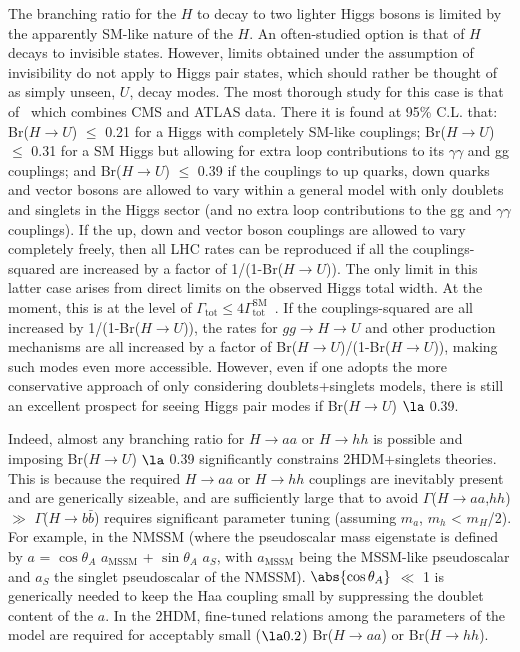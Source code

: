 The branching ratio for the $H$ to decay to two lighter Higgs bosons is limited by the apparently SM-like nature of the $H$. An often-studied option is that of $H$ decays to invisible states. However, limits obtained under the assumption of invisibility do not apply to Higgs pair states, which should rather be thought of as simply unseen, $U$, decay modes. The most thorough study for this case is that of~\cite{Belanger:2013xza} which combines CMS and ATLAS data. There it is found at 95\% C.L. that: Br($H$$\rightarrow$$U$) $\le$ 0.21 for a Higgs with completely SM-like couplings; Br($H$$\rightarrow$$U$) $\le$ 0.31 for a SM Higgs but allowing for extra loop contributions to its $\gamma\gamma$ and gg couplings; and Br($H$$\rightarrow$$U$) $\le$ 0.39 if the couplings to up quarks, down quarks and vector bosons are allowed to vary within a general model with only doublets and singlets in the Higgs sector (and no extra loop contributions to the gg and $\gamma\gamma$ couplings). If the up, down and vector boson couplings are allowed to vary completely freely, then all LHC rates can be reproduced if all the couplings-squared are increased by a factor of 1/(1-Br($H$$\rightarrow$$U$)). The only limit in this latter case arises from direct limits on the observed Higgs total width.  At the moment, this is at the level of $\Gamma_{\text{tot}} \le 4\Gamma_{\text{tot}}^{\text{SM}}$~\cite{CMSHwidth}. If the couplings-squared are all increased by 1/(1-Br($H$$\rightarrow$$U$)), the rates for $gg$$\rightarrow$$H$$\rightarrow$$U$ and other production mechanisms are all increased by a factor of Br($H$$\rightarrow$$U$)/(1-Br($H$$\rightarrow$$U$)), making such modes even more accessible. However, even if one adopts the more conservative approach of only considering doublets+singlets models, there is still an excellent prospect for seeing Higgs pair modes if Br($H$$\rightarrow$$U$) $\la$ 0.39.  

Indeed, almost any branching ratio for $H$$\rightarrow$$aa$ or $H$$\rightarrow$$hh$ is possible and imposing Br($H$$\rightarrow$$U$) $\la$ 0.39 significantly constrains 2HDM+singlets theories.  This is because the required $H$$\rightarrow$$aa$ or $H$$\rightarrow$$hh$ couplings are inevitably present and are generically sizeable, and are sufficiently large that to avoid $\Gamma$($H$$\rightarrow$$aa$,$hh$) $\gg$ $\Gamma$($H$$\rightarrow$$b\bar{b}$) requires significant parameter tuning (assuming $m_a$, $m_h$ < $m_H$/2). For example, in the NMSSM (where the pseudoscalar mass eigenstate is defined by $a$ = $\cos\theta_A$ $a_{\text{MSSM}}$ + $\sin\theta_A$ $a_S$, with $a_{\text{MSSM}}$ being the MSSM-like pseudoscalar and $a_S$ the singlet pseudoscalar of the NMSSM). $\abs{\cos\theta_A}$ $\ll$ 1 is generically needed to keep the Haa coupling small by suppressing the doublet content of the $a$.  In the 2HDM, fine-tuned relations among the parameters of the model are required for acceptably small ($\la 0.2$) Br($H$$\rightarrow$$aa$) or Br($H$$\rightarrow$$hh$).

